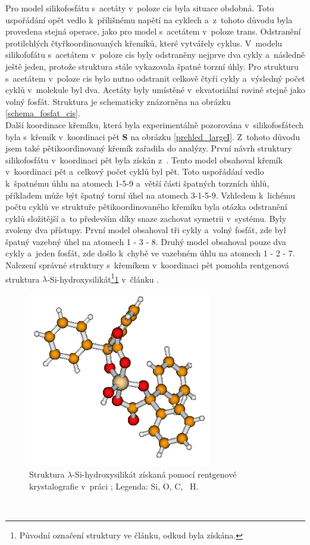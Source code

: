 \documentclass[
digital, %
table,   %
lof,     %
lot,     %
oneside,
]{fithesis3}
\begin{document}
Pro model silikofosfátu s~acetáty v~poloze cis byla situace obdobná. Toto uspořádání opět vedlo k~přílišnému napětí na cyklech a~z~tohoto důvodu byla provedena stejná operace, jako pro model s~acetátem v~poloze trans. Odstranění protilehlých čtyřkoordinovaných křemíků, které vytvářely cyklus. V~modelu silikofofátu s~acetátem v~poloze cis byly odstraněny nejprve dva cykly a~následně ještě jeden, protože struktura stále vykazovala špatné torzní úhly.
Pro strukturu s~acetátem v~poloze cis bylo nutno odstranit celkově čtyři cykly a~výsledný počet cyklů v~molekule byl dva. Acetáty byly umístěné v~ekvatoriální rovině stejně jako volný fosfát. Struktura je schematicky znázorněna na obrázku \ref{schema_fosfat_cis}. \\


Další koordinace křemíku, která byla experimentálně pozorována v~silikofosfátech byla s~křemík v~koordinaci pět \textbf{S} na obrázku \ref{prehled_largeI}.  Z~tohoto důvodu jsem také pětikoordinovaný křemík zařadila do analýzy. První návrh struktury silikofosfátu v~koordinaci pět byla získán z~\cite{pinkas_sdeleni}. Tento model obsahoval křemík v~koordinaci pět a~celkový počet cyklů byl pět. Toto uspořádání vedlo k~špatnému úhlu na atomech 1-5-9 a~větší části špatných torzních úhlů, příkladem může být špatný torní úhel na atomech 3-1-5-9.  Vzhledem k~lichému počtu cyklů ve struktuře pětikoordinovaného křemíku byla otázka odstranění cyklů složitější a~to především díky snaze zachovat symetrii v~systému. Byly zvoleny dva přístupy. První model obsahoval tři cykly a~volný fosfát, zde byl špatný vazebný úhel na atomech 1 - 3 - 8. Druhý model obsahoval pouze dva cykly a~jeden fosfát, zde došlo k~chybě ve vazebném úhlu na atomech 1 - 2 - 7. Nalezení správné struktury s~křemíkem v~koordinaci pět pomohla rentgenová struktura $\lambda$-Si-hydroxysilikát\footnote{Původní označení struktury ve článku, odkud byla získána.}\ref{rtg_5} v~článku \cite{rtg_5}.
\begin{figure}\begin{minipage}{\textwidth}
\begin{center}
\includegraphics[width=8cm]{rtg_5_koordinace.png}
\caption{Struktura $\lambda$-Si-hydroxysilikát získaná pomocí rentgenové krystalografie v~práci \cite{rtg_5};  Legenda:  Si,  O,  C, ~H.}
\label{rtg_5}
\end{center}\end{minipage}
\end{figure}\\
\end{document}
